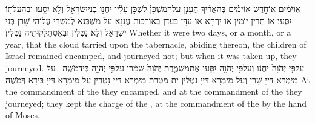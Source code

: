 {אֽוֹ\maqqaf יֹמַ֜יִם אוֹ\maqqaf חֹ֣דֶשׁ אוֹ\maqqaf יָמִ֗ים בְּהַאֲרִ֨יךְ הֶעָנָ֤ן עַל\maqqaf הַמִּשְׁכָּן֙ לִשְׁכֹּ֣ן עָלָ֔יו יַחֲנ֥וּ בְנֵֽי\maqqaf יִשְׂרָאֵ֖ל וְלֹ֣א יִסָּ֑עוּ וּבְהֵעָלֹת֖וֹ יִסָּֽעוּ׃}
{אוֹ תְּרֵין יוֹמִין אוֹ יַרְחָא אוֹ עִדָּן בְּעִדָּן בְּאוֹרָכוּת עֲנָנָא עַל מַשְׁכְּנָא לְמִשְׁרֵי עֲלוֹהִי שָׁרַן בְּנֵי יִשְׂרָאֵל וְלָא נָטְלִין וּבְאִסְתַּלָּקוּתֵיהּ נָטְלִין׃}
{Whether it were two days, or a month, or a year, that the cloud tarried upon the tabernacle, abiding thereon, the children of Israel remained encamped, and journeyed not; but when it was taken up, they journeyed.}{}
{עַל\maqqaf פִּ֤י יְהֹוָה֙ יַחֲנ֔וּ וְעַל\maqqaf פִּ֥י יְהֹוָ֖ה יִסָּ֑עוּ אֶת\maqqaf מִשְׁמֶ֤רֶת יְהֹוָה֙ שָׁמָ֔רוּ עַל\maqqaf פִּ֥י יְהֹוָ֖ה בְּיַד\maqqaf מֹשֶֽׁה׃ \petucha }
{עַל מֵימְרָא דַּייָ שָׁרַן וְעַל מֵימְרָא דַּייָ נָטְלִין יָת מַטְּרַת מֵימְרָא דַּייָ נָטְרִין עַל מֵימְרָא דַּייָ בִּידָא דְּמֹשֶׁה׃}
{At the commandment of the \lord\space they encamped, and at the commandment of the \lord\space they journeyed; they kept the charge of the \lord, at the commandment of the \lord\space by the hand of Moses.}{}

